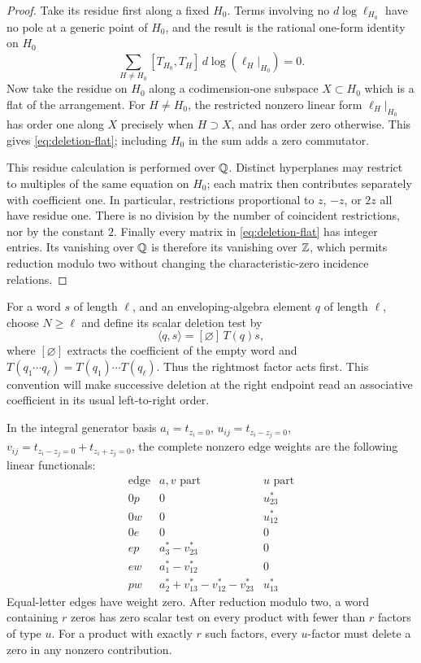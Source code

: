 \begin{proof}
Take its residue first along a fixed $H_0$.  Terms involving no
$d\log\ell_{H_0}$ have no pole at a generic point of $H_0$, and the
result is the rational one-form identity on $H_0$
\[
 \sum_{H\ne H_0}[T_{H_0},T_H]\,
 d\log(\ell_H|_{H_0})=0.
\]
Now take the residue on $H_0$ along a codimension-one subspace
$X\subset H_0$ which is a flat of the arrangement.  For $H\ne H_0$,
the restricted nonzero linear form $\ell_H|_{H_0}$ has order one along
$X$ precisely when $H\supset X$, and has order zero otherwise.  This
gives \eqref{eq:deletion-flat}; including $H_0$ in the sum adds a zero
commutator.

This residue calculation is performed over $\mathbb Q$.  Distinct hyperplanes
may restrict to multiples of the same equation on $H_0$; each matrix
then contributes separately with coefficient one.  In particular,
restrictions proportional to $z$, $-z$, or $2z$ all have residue one.
There is no division by the number of coincident restrictions, nor by
the constant $2$.  Finally every matrix in \eqref{eq:deletion-flat} has
integer entries.  Its vanishing over $\mathbb Q$ is therefore its vanishing
over $\mathbb Z$, which permits reduction modulo two without changing the
characteristic-zero incidence relations.
\end{proof}

For a word $s$ of length $\ell$, and an enveloping-algebra element $q$
of length $\ell$, choose $N\geq\ell$ and define its scalar deletion test by
\[
 \langle q,s\rangle=[\varnothing]\,T(q)s,
\]
where $[\varnothing]$ extracts the coefficient of the empty word and
$T(q_1\cdots q_\ell)=T(q_1)\cdots T(q_\ell)$.  Thus the rightmost
factor acts first.  This convention will make successive deletion at
the right endpoint read an associative coefficient in its usual
left-to-right order.

\begin{lemma}\label{lem:edge-table}
In the integral generator basis
$a_i=t_{z_i=0}$, $u_{ij}=t_{z_i-z_j=0}$,
$v_{ij}=t_{z_i-z_j=0}+t_{z_i+z_j=0}$, the complete nonzero edge weights
are the following linear functionals:
\begin{equation}\label{eq:deletion-edge-table}
\begin{array}{c|c|c}
\text{edge}&\text{$a,v$ part}&\text{$u$ part}\\ \hline
0p&0&u_{23}^{*}\\
0w&0&u_{12}^{*}\\
0e&0&0\\
ep&a_3^{*}-v_{23}^{*}&0\\
ew&a_1^{*}-v_{12}^{*}&0\\
pw&a_2^{*}+v_{13}^{*}-v_{12}^{*}-v_{23}^{*}&u_{13}^{*}
\end{array}
\end{equation}
Equal-letter edges have weight zero.  After reduction modulo two, a
word containing $r$ zeros has zero scalar test on every product with
fewer than $r$ factors of type $u$.  For a product with exactly $r$ such
factors, every $u$-factor must delete a zero in any nonzero contribution.
\end{lemma}

